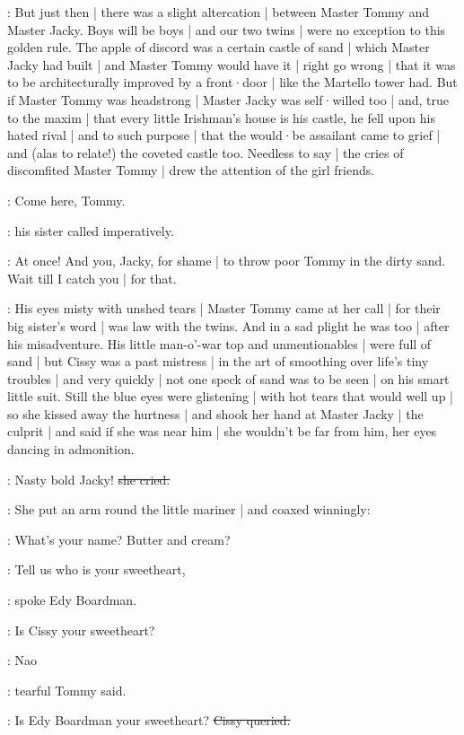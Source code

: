 :
But just then |
there was a slight altercation |%
between Master Tommy and Master Jacky.
Boys will be boys |
and our two twins |
were no exception to this golden rule.
The apple of discord was a certain castle of sand |
which Master Jacky had built |
and Master Tommy would have it |
right go wrong |
that it was to be architecturally improved
by a front·door |
like the Martello tower had.
But if Master Tommy was headstrong |
Master Jacky was self·willed too |
and,
true to the maxim |
that every little Irishman's house is his castle,
he fell upon his hated rival |
and to such purpose |
that the would·be assailant came to grief |
and
(alas to relate!)
the coveted castle too.
Needless to say |
the cries of discomfited Master Tommy |
drew the attention of the girl friends.%

\cissy:
Come here,
Tommy.

:
his sister called imperatively.

\cissy:
At once!
And you,
Jacky,
for shame |
to throw poor Tommy in the dirty sand.
Wait till I catch you |
for that.

:
His eyes misty with unshed tears |
Master Tommy came at her call |
for their big sister's word |
was law with the twins.
And in a sad plight he was too |
after his misadventure.
His little man-o'-war top and unmentionables |
were full of sand |
but Cissy was a past mistress |
in the art of smoothing over life's tiny troubles |
and very quickly |
not one speck of sand was to be seen |
on his smart little suit.
Still the blue eyes were glistening |
with hot tears that would well up |
so she kissed away
the hurtness |
and shook her hand at Master Jacky |
the culprit |
and said if she was near him |
she wouldn't be far from him,
her eyes dancing in admonition.

\cissy:
Nasty bold Jacky!
\sout{she cried.}

:
She put an arm round the little mariner |
and coaxed winningly:

\cissy:
What's your name?
Butter and cream?

\edy:
Tell us who is your sweetheart,

:
spoke Edy Boardman.

\edy:
Is Cissy your sweetheart?

\tommy:
Nao
\stage{[tearfully]}

:
tearful Tommy said.

\cissy:
Is Edy Boardman your sweetheart?
\sout{Cissy queried.}

